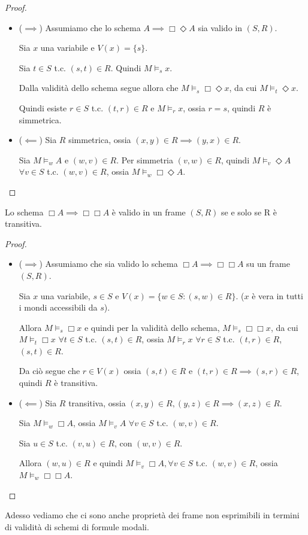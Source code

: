 \documentclass[../main.tex]{subfiles}
\begin{document}
\begin{proof}\
    \begin{itemize}
        \item ($\implies$) Assumiamo che lo schema $A \implies \Box \Diamond A $ sia valido in $(S,R)$.

              Sia $x$ una variabile e $V(x) = \{s\}$.

              Sia $t \in S$ t.c. $(s,t) \in R$. Quindi $M \vDash_s x$.

              Dalla validità dello schema segue allora che $M \vDash_s \Box \Diamond x$, da cui $M \vDash_t \Diamond x$.

              Quindi esiste $r \in S$ t.c. $(t,r) \in R$ e $M \vDash_r x$, ossia $r = s$, quindi $R$ è simmetrica.
        \item ($\impliedby$) Sia $R$ simmetrica, ossia $(x,y) \in R \implies (y,x) \in R$.

              Sia $M \vDash_w A$ e $(w,v) \in R$. Per simmetria $(v,w) \in R$, quindi $M \vDash_v \Diamond A$ $\forall v \in S$ t.c. $(w,v) \in R$, ossia $M \vDash_w \Box \Diamond A$.
    \end{itemize}
\end{proof}
\begin{theorem}
    Lo schema $\Box A \implies \Box \Box A$ è valido in un frame $(S,R)$ se e solo se R è transitiva.
\end{theorem}
\begin{proof}\
    \begin{itemize}
        \item ($\implies$) Assumiamo che sia valido lo schema $\Box A \implies \Box \Box A$ su un frame $(S,R)$.

              Sia $x$ una variabile, $s \in S$ e $V(x) = \{w \in S : (s,w) \in R\}$. ($x$ è vera in tutti i mondi accessibili da $s$).

              Allora $M \vDash_s \Box x$ e quindi per la validità dello schema, $M \vDash_s \Box \Box x $, da cui $M \vDash_t \Box x$ $\forall t \in S$ t.c. $(s,t) \in R$, ossia $M \vDash_r x$ $\forall r \in S$ t.c. $(t,r) \in R$, $(s,t) \in R$.

              Da ciò segue che $r \in V(x)$ ossia $(s,t) \in R$ e $(t,r) \in R \implies (s,r) \in R$, quindi $R$ è transitiva.
        \item ($\impliedby$) Sia $R$ transitiva, ossia $(x,y) \in R, (y,z) \in R \implies (x,z) \in R$.

              Sia $M \vDash_w \Box A$, ossia $M \vDash_v A$ $\forall v \in S$ t.c. $(w,v) \in R$.

              Sia $u \in S$ t.c. $(v,u) \in R$, con $(w,v) \in R$.

              Allora $(w,u) \in R$ e quindi $M \vDash_v \Box A, \forall v \in S$ t.c. $(w,v) \in R$, ossia $M \vDash_w \Box \Box A$.
    \end{itemize}
\end{proof}
Adesso vediamo che ci sono anche proprietà dei frame non esprimibili in termini di validità di schemi di formule modali.
\end{document}
